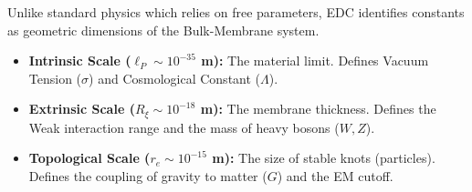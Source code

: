 \vspace{0.5em}

\begin{tcolorbox}[colback=white,colframe=black,title=\textbf{CORE IDENTIFICATIONS (The Three Scales)}]
Unlike standard physics which relies on free parameters, EDC identifies constants as geometric dimensions of the Bulk-Membrane system.

\begin{itemize}
    \item \textbf{Intrinsic Scale ($\ell_P \sim 10^{-35}$ m):}
    The material limit. Defines Vacuum Tension ($\sigma$) and Cosmological Constant ($\Lambda$).
    
    \item \textbf{Extrinsic Scale ($R_\xi \sim 10^{-18}$ m):}
    The membrane thickness. Defines the Weak interaction range and the mass of heavy bosons ($W, Z$).
    
    \item \textbf{Topological Scale ($r_e \sim 10^{-15}$ m):}
    The size of stable knots (particles). Defines the coupling of gravity to matter ($G$) and the EM cutoff.
\end{itemize}
\end{tcolorbox}

\vspace{0.5em}

